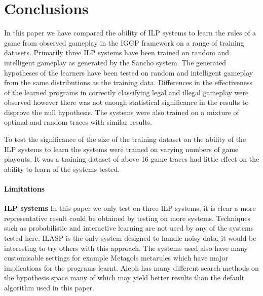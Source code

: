 \chapter{Conclusions}
In this paper we have compared the ability of ILP systems to learn the rules of a game from observed gameplay in the IGGP framework on a range of training datasets. Primarily three ILP systems have been trained on random and intelligent gameplay as generated by the Sancho system. The generated hypotheses of the learners have been tested on random and intelligent gameplay from the same distributions as the training data. Differences in the effectiveness of the learned programs in correctly classifying legal and illegal gameplay were observed however there was not enough statistical significance in the results to disprove the null hypothesis. The systems were also trained on a mixture of optimal and random traces with similar results.

To test the significance of the size of the training dataset on the ability of the ILP systems to learn the systems were trained on varying numbers of game playouts. It was a training dataset of above 16 game traces had little effect on the ability to learn of the systems tested. 

\subsubsection{Limitations}



\textbf{ILP systems} In this paper we only test on three ILP systems, it is clear a more representative result could be obtained by testing on more systems. Techniques such as probabilistic\cite{Bellodi/Probablistic,Raedt/Probabalistic} and interactive\cite{Raedt/Interactive} learning are not used by any of the systems tested here. ILASP is the only system designed to handle noisy data\cite{MarkLaw/ILASP2i}, it would be interesting to try others with this approach\cite{Oblak/Noise,Evans/Noise}. The systems used also have many customisable settings for example Metagols metarules which have major implications for the programs learnt\cite{Cropper/Metarules}. Aleph has many different search methods on the hypothesis space many of which may yield better results than the default algorithm used in this paper.

